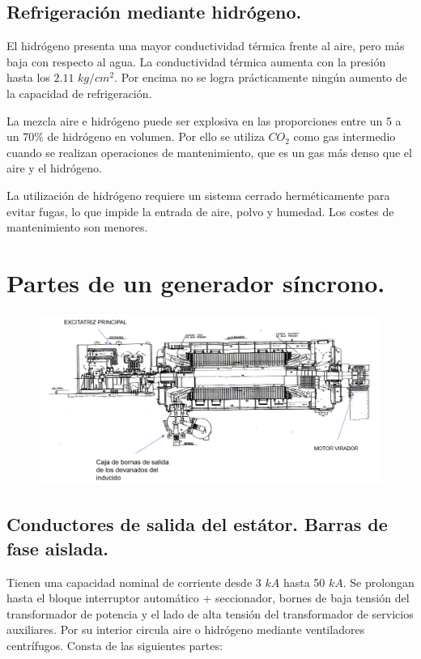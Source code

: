 		\subsection{Refrigeración mediante hidrógeno.}
			El hidrógeno presenta una mayor conductividad térmica frente al aire, pero más baja con respecto al agua. La conductividad térmica aumenta con la presión hasta los $2.11$ $kg/cm^2$. Por encima no se logra prácticamente ningún aumento de la capacidad de refrigeración.
			
			
			La mezcla aire e hidrógeno puede ser explosiva en las proporciones entre un 5 a un 70\% de hidrógeno en volumen. Por ello se utiliza $CO_2$ como gas intermedio cuando se realizan operaciones de mantenimiento, que es un gas más denso que el aire y el hidrógeno.
			
			
			La utilización de hidrógeno requiere un sistema cerrado herméticamente para evitar fugas, lo que impide la entrada de aire, polvo y humedad. Los costes de mantenimiento son menores. 
			
	\section{Partes de un generador síncrono.}
		\begin{figure}[H]
			\centering
			\includegraphics[width=1\linewidth]{res/tema6/generador}
			\label{fig:generador}
		\end{figure}
		
		\subsection{Conductores de salida del estátor. Barras de fase aislada.}
			Tienen una capacidad nominal de corriente desde 3 $kA$ hasta 50 $kA$. Se prolongan hasta el bloque interruptor automático + seccionador, bornes de baja tensión del transformador de potencia y el lado
			de alta tensión del transformador de servicios auxiliares. Por su interior circula aire o hidrógeno mediante ventiladores centrífugos. Consta de las siguientes partes:
			
